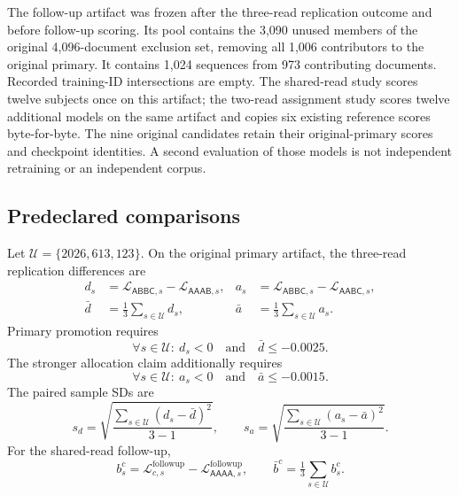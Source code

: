 \documentclass[11pt,letterpaper]{article}
\newcommand{\route}[1]{\textsf{#1}}
\newcommand{\Loss}{\mathcal{L}}
\begin{document}
The follow-up artifact was frozen after the three-read replication outcome and
before follow-up scoring. Its pool contains the 3,090 unused members of the
original 4,096-document exclusion set, removing all 1,006 contributors to
the original primary. It contains 1,024 sequences from 973 contributing
documents. Recorded training-ID intersections are empty. The shared-read
study scores twelve subjects once on this artifact; the two-read assignment
study scores twelve additional
models on the same artifact and copies six existing reference scores
byte-for-byte. The nine original candidates retain their original-primary
scores and checkpoint identities. A second evaluation of those models is
not independent retraining or an independent corpus.

\subsection{Predeclared comparisons}
Let $\mathcal U=\{2026,613,123\}$. On the original primary artifact, the
three-read replication differences are
\begin{align}
 d_s &= \Loss_{\route{ABBC},s}-\Loss_{\route{AAAB},s}, &
 a_s &= \Loss_{\route{ABBC},s}-\Loss_{\route{AABC},s},\\
 \bar d &= \tfrac{1}{3}\sum_{s\in\mathcal U} d_s, &
 \bar a &= \tfrac{1}{3}\sum_{s\in\mathcal U} a_s.
 \label{eq:seed-contrasts}
\end{align}
Primary promotion requires
\begin{equation}
 \boxed{\forall s\in\mathcal U:\ d_s<0\quad\text{and}\quad\bar d\leq-0.0025.}
 \label{eq:primary-gate}
\end{equation}
The stronger allocation claim additionally requires
\begin{equation}
 \boxed{\forall s\in\mathcal U:\ a_s<0\quad\text{and}\quad\bar a\leq-0.0015.}
 \label{eq:allocation-gate}
\end{equation}
The paired sample SDs are
\begin{equation}
 s_d=\sqrt{\frac{\sum_{s\in\mathcal U}(d_s-\bar d)^2}{3-1}},
 \qquad
 s_a=\sqrt{\frac{\sum_{s\in\mathcal U}(a_s-\bar a)^2}{3-1}}.
 \label{eq:seed-sd}
\end{equation}
For the shared-read follow-up,
\begin{equation}
 b_s^c=\Loss^{\mathrm{followup}}_{c,s}
       -\Loss^{\mathrm{followup}}_{\route{AAAA},s},\qquad
 \bar b^c=\tfrac13\sum_{s\in\mathcal U}b_s^c.
 \label{eq:stage-a-contrast}
\end{equation}
\end{document}
